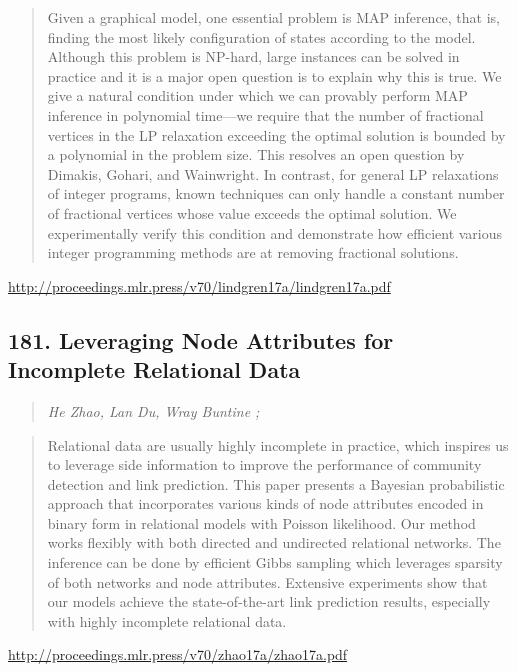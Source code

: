 \documentclass{article}
\begin{document}
\begin{quote}
    Given a graphical model, one essential problem is MAP inference, that is, finding the most likely configuration of states according to the model. Although this problem is NP-hard, large instances can be solved in practice and it is a major open question is to explain why this is true. We give a natural condition under which we can provably perform MAP inference in polynomial time—we require that the number of fractional vertices in the LP relaxation exceeding the optimal solution is bounded by a polynomial in the problem size. This resolves an open question by Dimakis, Gohari, and Wainwright. In contrast, for general LP relaxations of integer programs, known techniques can only handle a constant number of fractional vertices whose value exceeds the optimal solution. We experimentally verify this condition and demonstrate how efficient various integer programming methods are at removing fractional solutions.  \end{quote}

\href{http://proceedings.mlr.press/v70/lindgren17a/lindgren17a.pdf}{http://proceedings.mlr.press/v70/lindgren17a/lindgren17a.pdf}

\subsection{181. Leveraging Node Attributes for Incomplete Relational Data}

\begin{quote}
\footnotesize{\textit{He Zhao, Lan Du, Wray Buntine ;}}
\end{quote}

\begin{quote}
    Relational data are usually highly incomplete in practice, which inspires us to leverage side information to improve the performance of community detection and link prediction. This paper presents a Bayesian probabilistic approach that incorporates various kinds of node attributes encoded in binary form in relational models with Poisson likelihood. Our method works flexibly with both directed and undirected relational networks. The inference can be done by efficient Gibbs sampling which leverages sparsity of both networks and node attributes. Extensive experiments show that our models achieve the state-of-the-art link prediction results, especially with highly incomplete relational data.  \end{quote}

\href{http://proceedings.mlr.press/v70/zhao17a/zhao17a.pdf}{http://proceedings.mlr.press/v70/zhao17a/zhao17a.pdf}
\end{document}
